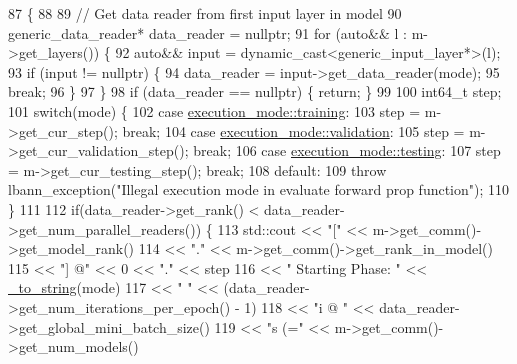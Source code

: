 \begin{DoxyCode}
87                                                                                   \{
88 
89   \textcolor{comment}{// Get data reader from first input layer in model}
90   generic\_data\_reader* data\_reader = \textcolor{keyword}{nullptr};
91   \textcolor{keywordflow}{for} (\textcolor{keyword}{auto}&& l : m->get\_layers()) \{
92     \textcolor{keyword}{auto}&& input = \textcolor{keyword}{dynamic\_cast<}generic\_input\_layer*\textcolor{keyword}{>}(l);
93     \textcolor{keywordflow}{if} (input != \textcolor{keyword}{nullptr}) \{
94       data\_reader = input->get\_data\_reader(mode);
95       \textcolor{keywordflow}{break};
96     \}
97   \}
98   \textcolor{keywordflow}{if} (data\_reader == \textcolor{keyword}{nullptr}) \{ \textcolor{keywordflow}{return}; \}
99 
100   int64\_t step;
101   \textcolor{keywordflow}{switch}(mode) \{
102   \textcolor{keywordflow}{case} \hyperlink{base_8hpp_a2781a159088df64ed7d47cc91c4dc0a8ac185ddac8b5a8f5aa23c5b80bc12d214}{execution\_mode::training}:
103     step = m->get\_cur\_step(); \textcolor{keywordflow}{break};
104   \textcolor{keywordflow}{case} \hyperlink{base_8hpp_a2781a159088df64ed7d47cc91c4dc0a8aa617908b172c473cb8e8cda059e55bf0}{execution\_mode::validation}:
105     step = m->get\_cur\_validation\_step(); \textcolor{keywordflow}{break};
106   \textcolor{keywordflow}{case} \hyperlink{base_8hpp_a2781a159088df64ed7d47cc91c4dc0a8aae2b1fca515949e5d54fb22b8ed95575}{execution\_mode::testing}:
107     step = m->get\_cur\_testing\_step(); \textcolor{keywordflow}{break};
108   \textcolor{keywordflow}{default}:
109     \textcolor{keywordflow}{throw} lbann\_exception(\textcolor{stringliteral}{"Illegal execution mode in evaluate forward prop function"});
110   \}
111 
112   \textcolor{keywordflow}{if}(data\_reader->get\_rank() < data\_reader->get\_num\_parallel\_readers()) \{
113     std::cout << \textcolor{stringliteral}{"["} << m->get\_comm()->get\_model\_rank()
114               << \textcolor{stringliteral}{"."} << m->get\_comm()->get\_rank\_in\_model()
115               << \textcolor{stringliteral}{"] @"} << 0 << \textcolor{stringliteral}{"."} << step
116               << \textcolor{stringliteral}{" Starting Phase: "} << \hyperlink{base_8hpp_adeeaddd10bd31df0cae7cb0fcae45d5c}{\_to\_string}(mode)
117               << \textcolor{stringliteral}{" "} << (data\_reader->get\_num\_iterations\_per\_epoch() - 1)
118               << \textcolor{stringliteral}{"i @ "} << data\_reader->get\_global\_mini\_batch\_size()
119               << \textcolor{stringliteral}{"s (="} << m->get\_comm()->get\_num\_models()

\end{DoxyCode}
